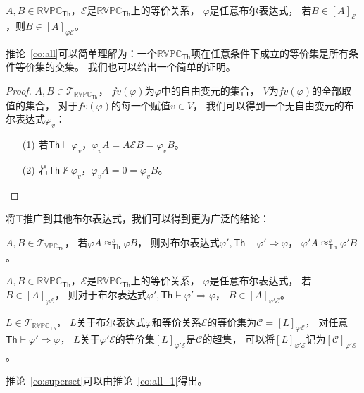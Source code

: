    \begin{corollary}\label{co:all}
      $A,B\in \mathbb{RVPC}_{\mathsf{Th}}$，$\mathcal{E}$是$\mathbb{RVPC}_{\mathsf{Th}}$上的等价关系，
      $\varphi$是任意布尔表达式，
      若$B\in [A]_{\mathcal{E}}$，则$B\in [A]_{\varphi \mathcal{E}}$。
   \end{corollary}
   
   推论~\ref{co:all}可以简单理解为：一个$\mathbb{RVPC}_{\mathsf{Th}}$项在任意条件下成立的等价集是所有条件等价集的交集。
   我们也可以给出一个简单的证明。
   \begin{proof}
      $A,B\in \mathcal{T}_{\mathbb{RVPC}_{\mathsf{Th}}}$，
      $fv(\varphi)$为$\varphi$中的自由变元的集合，
      $V$为$fv(\varphi)$的全部取值的集合，
      对于$fv(\varphi)$的每一个赋值$v\in V$，
      我们可以得到一个无自由变元的布尔表达式$\varphi_v$：
      \begin{itemize}
         \item[(1)] {
            若$\mathsf{Th}\vdash \varphi_v$，$\varphi_vA=A\mathcal{E}B=\varphi_v B$。
         }
         \item[(2)] {
            若$\mathsf{Th}\not\vdash \varphi_v$，$\varphi_v A=0=\varphi_v B$。
         }
      \end{itemize}
   \end{proof}

   将$\top$推广到其他布尔表达式，我们可以得到更为广泛的结论：

   \begin{corollary}\label{co:condition}
      $A,B\in \mathcal{T}_{\mathbb{VPC}_{\mathsf{Th}}}$，
      若$\varphi A\approxeq_{\mathsf{Th}}^s \varphi B$，
      则对布尔表达式$\varphi',\mathsf{Th}\vdash \varphi'\Rightarrow \varphi$，
      $\varphi' A\approxeq_{\mathsf{Th}}^s\varphi' B$。
   \end{corollary}

   \begin{corollary}\label{co:all_1}
      $A,B\in \mathbb{RVPC}_{\mathsf{Th}}$，$\mathcal{E}$是$\mathbb{RVPC}_{\mathsf{Th}}$上的等价关系，
      $\varphi$是任意布尔表达式，
      若$B\in [A]_{\varphi\mathcal{E}}$，
      则对于布尔表达式$\varphi',\mathsf{Th}\vdash\varphi'\Rightarrow \varphi$，
      $B\in [A]_{\varphi' \mathcal{E}}$。
   \end{corollary}

   \begin{corollary}\label{co:superset}
      $L\in \mathcal{T}_{\mathbb{RVPC}_{\mathsf{Th}}}$，
      $L$关于布尔表达式$\varphi$和等价关系$\mathcal{E}$的等价集为$\mathcal{C}=[L]_{\varphi\mathcal{E}}$，
      对任意$\mathsf{Th}\vdash \varphi'\Rightarrow\varphi$，
      $L$关于$\varphi'\mathcal{E}$的等价集$[L]_{\varphi'\mathcal{E}}$是$\mathcal{C}$的超集，
      可以将$[L]_{\varphi'\mathcal{E}}$记为$[\mathcal{C}]_{\varphi'\mathcal{E}}$。
   \end{corollary}
   推论~\ref{co:superset}可以由推论~\ref{co:all_1}得出。

